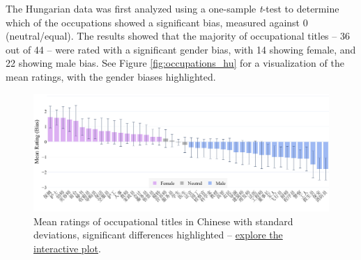 \documentclass[11pt]{article}
\begin{document}


The Hungarian data was first analyzed using a one-sample \textit{t}-test to determine which of the occupations showed a significant bias, measured against 0 (neutral/equal). The results showed that the majority of occupational titles -- 36 out of 44 -- were rated with a significant gender bias, with 14 showing female, and 22 showing male bias. See Figure \ref{fig:occupations_hu} for a visualization of the mean ratings, with the gender biases highlighted.


\begin{figure}[!ht]
  \centering
  \includegraphics[width=\linewidth]{../occupations_zh}
  \caption{Mean ratings of occupational titles in Chinese with standard deviations, significant differences highlighted -- \href{https://htmlpreview.github.io/?https://github.com/partigabor/occupational-bias/blob/main/occupations_zh.html}{explore the interactive plot}.}
  \label{fig:occupations_zh}
\end{figure}

\end{document}
